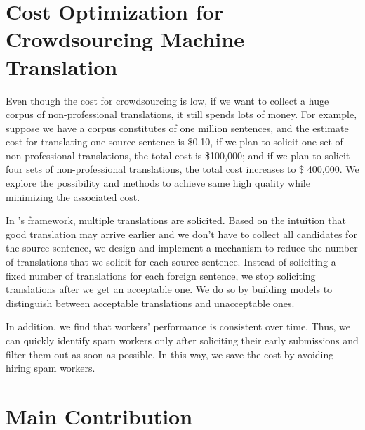 \section{Cost Optimization for Crowdsourcing Machine Translation}
Even though the cost for crowdsourcing is low, if we want to collect a huge corpus of non-professional translations, it still spends lots of money. For example, suppose we have a corpus constitutes of one million sentences, and the estimate cost for translating one source sentence is \$0.10, if we plan to solicit one set of non-professional translations, the total cost is \$100,000; and if we plan to solicit four sets of non-professional translations, the total cost increases to \$ 400,000. We explore the possibility and methods to achieve same high quality while minimizing the associated cost. 

In \cite{zaidan-callisonburch:2011:ACL-HLT2011a}'s framework, multiple translations are solicited. Based on the intuition that good translation may arrive earlier and we don't have to collect all candidates for the source sentence, we design and implement a mechanism to  reduce the number of translations that we solicit for each source sentence. Instead of soliciting a fixed number of translations for each foreign sentence, we stop soliciting translations after we get an acceptable one.  We do so by building models to distinguish between acceptable translations and unacceptable ones. 

In addition, we find that workers' performance is consistent over time. Thus, we can quickly identify spam workers only after soliciting their early submissions and filter them out as soon as possible. In this way, we save the cost by avoiding hiring spam workers.

\section{Main Contribution}

